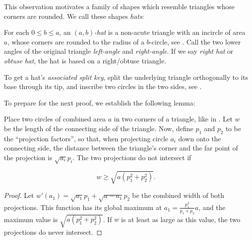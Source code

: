 \documentclass[a4paper,style=print,oneside,bibliography=totoc,nexus,lnum,extramargin]{tubsbook}
\begin{document}
This observation motivates a family of shapes which resemble triangles whose corners are rounded. We call these shapes \emph{hats}:

\begin{definition}
    For each $0 \le b \le a$, an \emph{$(a,b)$-hat} is a non-acute triangle with an incircle of area $a$, whose corners are rounded to the radius of a $b$-circle, see .
    Call the two lower angles of the original triangle \emph{left-angle} and \emph{right-angle}.
    If we say \emph{right hat} or \emph{obtuse hat}, the hat is based on a right/obtuse triangle.
\end{definition}

\newcommand\defaulta{30}
\newcommand\defaultb{40}
\newcommand\defaultr{0.2}
\newcommand\defaultx{0.7}


\begin{definition}\label{def:hat-split-key}
    To get a hat's \emph{associated split key}, split the underlying triangle orthogonally to its base through its tip, and inscribe two circles in the two sides, see .
\end{definition}


To prepare for the next proof, we establish the following lemma:

\begin{lemma}\label{th:overlap}
    Place two circles of combined area $a$ in two corners of a triangle, like in . Let $w$ be the length of the connecting side of the triangle. Now, define $p_1$ and $p_2$ to be the “projection factors”, so that, when projecting circle $a_i$ down onto the connecting side, the distance between the triangle's corner and the far point of the projection is $\sqrt{a_i}p_i$. The two projections do not intersect if

    $$w \ge \sqrt{a(p_1^2 + p_2^2)}.$$
\end{lemma}

\begin{proof}
    Let $w'(a_1) = \sqrt{a_1}p_1 + \sqrt{a-a_1}p_2$ be the combined width of both projections. This function has its global maximum at $a_1 = \frac{p_1^2}{p_1+p_2}a$, and the maximum value is $\sqrt{a(p_1^2+p_2^2)}$. If $w$ is at least as large as this value, the two projections do never intersect.
\end{proof}
\end{document}
